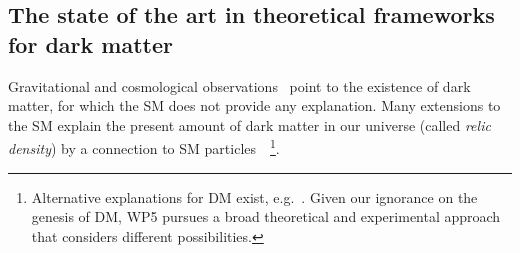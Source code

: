 \subsection{The state of the art in theoretical frameworks for dark matter}
\label{sub:stateOfTheArtTheory}
\smallskip

Gravitational and cosmological observations~\cite{Bertone:2016nfn} point to the existence of dark matter, for which the SM does not provide any explanation. 
Many extensions to the SM explain the present amount of dark matter in our universe (called \textit{relic density}) by a connection to SM particles~\cite{Hall:2009bx,Bernal:2017kxu,Steigman:2012nb}~\footnote{Alternative explanations for DM exist, e.g.~\cite{McGaugh_2016,Lennon:2017tqq,Bird:2016dcv,Marsh:2015xka}. Given our ignorance on the genesis of DM, WP5 pursues a broad theoretical and experimental approach that considers different possibilities.}. 

